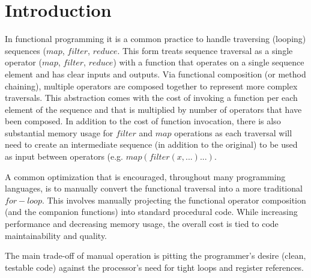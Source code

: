 \chapter{Introduction}
In functional programming it is a common practice to handle traversing (looping) sequences ($map$, $filter$, $reduce$. This form treats sequence traversal as a single operator ($map$, $filter$, $reduce$) with a function that operates on a single sequence element and has clear inputs and outputs.  Via functional composition (or method chaining), multiple operators are composed together to represent more complex traversals.  This abstraction comes with the cost of invoking a function per each element of the sequence and that is multiplied by number of operators that have been composed. In addition to the cost of function invocation, there is also substantial memory usage for $filter$ and $map$ operations as each traversal will need to create an intermediate sequence (in addition to the original) to be used as input between operators (e.g. $map(filter(x, ...)...)$.  

A common optimization that is encouraged, throughout many programming languages, is to manually convert the functional traversal into a more traditional $for-loop$.  This involves manually projecting the functional operator composition (and the companion functions) into standard procedural code.  While increasing performance and decreasing memory usage, the overall cost is tied to code maintainability and quality.  

The main trade-off of manual operation is pitting the programmer's desire (clean, testable code) against the processor's need for tight loops and register references.  